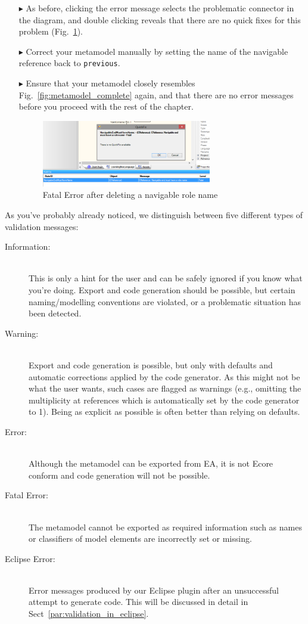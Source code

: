 \begin{enumerate}
\item[$\blacktriangleright$] As before, clicking the error message selects the problematic connector in the diagram, and double clicking reveals that there are no quick fixes for this problem (Fig.~\ref{fig:fatal-error}).
\item[$\blacktriangleright$] Correct your metamodel manually by setting the name of the navigable reference back to \texttt{previous}.
\item[$\blacktriangleright$] Ensure that your metamodel closely resembles Fig.~\ref{fig:metamodel_complete} again, and that there are no error messages before you proceed with the rest of the chapter.

\begin{figure}[htbp]
	\centering
  \includegraphics[width=0.7\textwidth]{pics/memBoxBilder/memBox47}
	\caption{Fatal Error after deleting a navigable role name}
	\label{fig:fatal-error}
\end{figure}
\end{enumerate}

As you've probably already noticed, we distinguish between five different types of validation messages:
\begin{description}
  \item[Information:]~\\
  This is only a hint for the user and can be safely ignored if you know what you're doing.
  Export and code generation should be possible, but certain naming/modelling conventions are violated, or a problematic situation has been detected.
  \item[Warning:]~\\ Export and code generation is possible, but only with defaults and automatic corrections applied by the code generator.
  As this might not be what the user wants, such cases are flagged as warnings (e.g., omitting the multiplicity at references which is automatically set by the code generator to 1).
  Being as explicit as possible is often better than relying on defaults.
  \item[Error:]~\\ Although the metamodel can be exported from EA, it is not Ecore conform and code generation will not be possible.
  \item[Fatal Error:]~\\ The metamodel cannot be exported as required information such as names or classifiers of model elements are incorrectly set or missing.
  \item[Eclipse Error:]~\\ Error messages produced by our Eclipse plugin after an unsuccessful attempt to generate code.
   This will be discussed in detail in Sect~\ref{par:validation_in_eclipse}.

\end{description}

